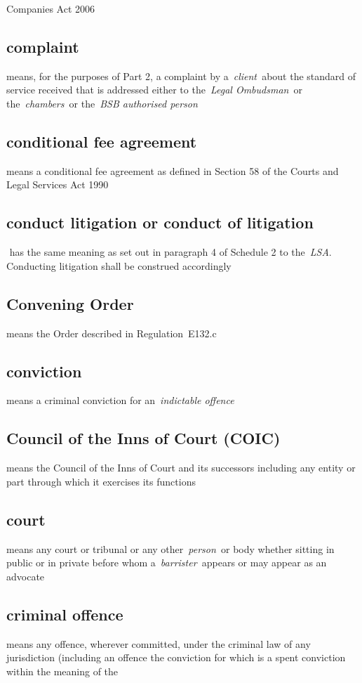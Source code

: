   Companies Act 2006  \subsection{complaint } means, for the purposes of Part 2, a complaint by
  a~\emph{client~}about the standard of service received that is
  addressed either to the~\emph{Legal Ombudsman~}or
  the~\emph{chambers~}or the~\emph{BSB authorised person} \subsection{conditional fee agreement } means a conditional fee agreement
  as defined in Section 58 of the Courts and Legal Services Act 1990  \subsection{conduct litigation or conduct of litigation } has the same
  meaning as set out in paragraph 4 of Schedule 2 to the~\emph{LSA}.
  Conducting litigation shall be construed accordingly  \subsection{Convening Order } means the Order described in
  Regulation~E132.c  \subsection{conviction } means a criminal conviction for
  an~\emph{indictable offence} \subsection{Council of the Inns of Court (COIC) } means the Council of
  the Inns of Court and its successors including any entity or part
  through which it exercises its functions  \subsection{court } means any court or tribunal or any
  other~\emph{person~}or body whether sitting in public or in private
  before whom a~\emph{barrister~}appears or may appear as an advocate  \subsection{criminal offence } means any offence, wherever committed,
  under the criminal law of any jurisdiction (including an offence the
  conviction for which is a spent conviction within the meaning of the
